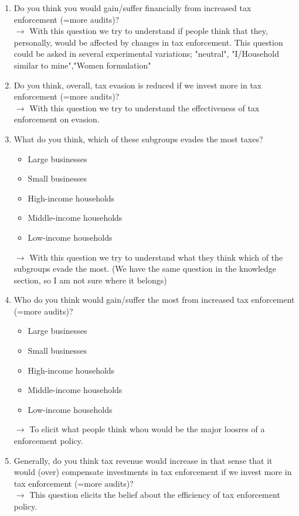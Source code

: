\documentclass[12pt]{article}
\begin{document}
\begin{enumerate}
    \item Do you think you would gain/suffer financially from increased tax enforcement (=more audits)? \\ $\rightarrow$ With this question we try to understand if people think that they, personally, would be affected by changes in tax enforcement. This question could be asked in several experimental variations; "neutral", "I/Household similar to mine","Women formulation" 
    \item Do you think, overall, tax evasion is reduced if we invest more in tax enforcement (=more audits)? \\ $\rightarrow$ With this question we try to understand the effectiveness of tax enforcement on evasion. 
    \item What do you think, which of these subgroups evades the most taxes?
    \begin{itemize}
        \item Large businesses
        \item Small businesses
        \item High-income households
        \item Middle-income households
        \item Low-income households
    \end{itemize} $\rightarrow$ With this question we try to understand what they think which of the subgroups evade the most. (We have the same question in the knowledge section, so I am not sure where it belongs)
    \item Who do you think would gain/suffer the most from increased tax enforcement (=more audits)?
    \begin{itemize}
        \item Large businesses
        \item Small businesses
        \item High-income households
        \item Middle-income households
        \item Low-income households
    \end{itemize} $\rightarrow$ To elicit what people think whou would be the major loosres of a enforcement policy. 
    \item Generally, do you think tax revenue would increase in that sense that it would (over) compensate investments in tax enforcement if we invest more in tax enforcement (=more audits)? \\ $\rightarrow$ This question elicits the belief about the efficiency of tax enforcement policy. 

\end{enumerate}
\end{document}
